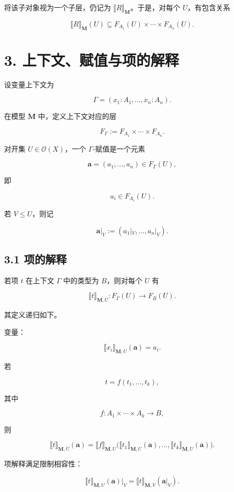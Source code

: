 \documentclass{ctexart}
\begin{document}
将该子对象视为一个子层，仍记为 $\llbracket R\rrbracket_{\mathbf M}$。于是，对每个 $U$，有包含关系

\[
\llbracket R\rrbracket_{\mathbf M}(U)
\subseteq
F_{A_1}(U)\times\cdots\times F_{A_n}(U).
\]

\section*{3. 上下文、赋值与项的解释}

设变量上下文为

\[
\Gamma=(x_1:A_1,\ldots,x_n:A_n).
\]

在模型 $\mathbf M$ 中，定义上下文对应的层

\[
F_\Gamma
:=
F_{A_1}\times\cdots\times F_{A_n}.
\]

对开集 $U\in\mathcal O(X)$，一个 $\Gamma$-赋值是一个元素

\[
\mathbf a=(a_1,\ldots,a_n)\in F_\Gamma(U),
\]

即

\[
a_i\in F_{A_i}(U).
\]

若 $V\le U$，则记

\[
\mathbf a|_V
:=
(a_1|_V,\ldots,a_n|_V).
\]

\subsection*{3.1 项的解释}

若项 $t$ 在上下文 $\Gamma$ 中的类型为 $B$，则对每个 $U$ 有

\[
\llbracket t\rrbracket_{\mathbf M,U}:
F_\Gamma(U)\longrightarrow F_B(U).
\]

其定义递归如下。

变量：

\[
\llbracket x_i\rrbracket_{\mathbf M,U}(\mathbf a)=a_i.
\]

若

\[
t=f(t_1,\ldots,t_k),
\]

其中

\[
f:A_1\times\cdots\times A_k\to B,
\]

则

\[
\llbracket t\rrbracket_{\mathbf M,U}(\mathbf a)
=
\llbracket f\rrbracket_{\mathbf M,U}
\bigl(
\llbracket t_1\rrbracket_{\mathbf M,U}(\mathbf a),
\ldots,
\llbracket t_k\rrbracket_{\mathbf M,U}(\mathbf a)
\bigr).
\]

项解释满足限制相容性：

\[
\llbracket t\rrbracket_{\mathbf M,U}(\mathbf a)|_V
=
\llbracket t\rrbracket_{\mathbf M,V}(\mathbf a|_V).
\]
\end{document}
